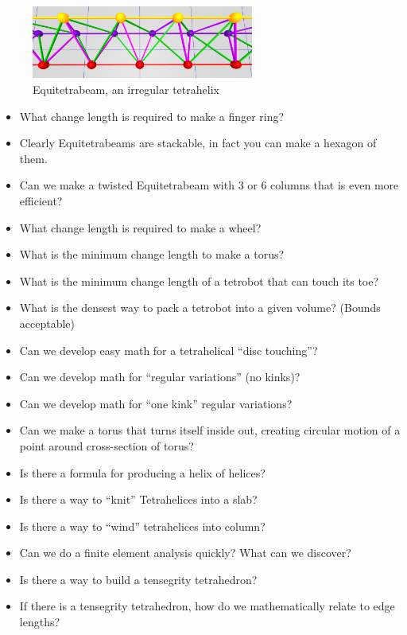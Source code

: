 \documentclass[11pt]{article}
\begin{document}
\begin{figure}
     \centering
     \includegraphics[width=0.65\textwidth]{figures/EquitetrabeamCloseUp.png}
     \caption{Equitetrabeam, an irregular tetrahelix}
  \label{fig:equitetrabeam}
\end{figure}

\begin{itemize}
\item What change length is required to make a finger ring?
\item Clearly Equitetrabeams are stackable, in fact you can make a hexagon of them.
\item Can we make a twisted Equitetrabeam with 3 or 6 columns that is even more efficient?
\item What change length is required to make a  wheel?
\item What is the minimum change length to make a torus?
\item What is the minimum change length of a tetrobot that can touch its toe?
\item What is the densest way to pack a tetrobot into a given volume? (Bounds acceptable)
\item Can we develop easy math for a tetrahelical ``disc touching''?
\item Can we develop math for ``regular variations'' (no kinks)?
\item Can we develop math for ``one kink'' regular variations?
\item Can we make a torus that turns itself inside out, creating circular motion of a point around cross-section of torus?
\item Is there a formula for producing a helix of helices?
\item Is there a way to ``knit'' Tetrahelices into  a slab?
\item Is there a way to ``wind'' tetrahelices into column?
\item Can we do a finite element analysis quickly? What can we discover?
\item Is there a way to build a tensegrity tetrahedron?
\item If there is a tensegrity tetrahedron, how do we mathematically relate to edge lengths?

\end{itemize}
\end{document}
